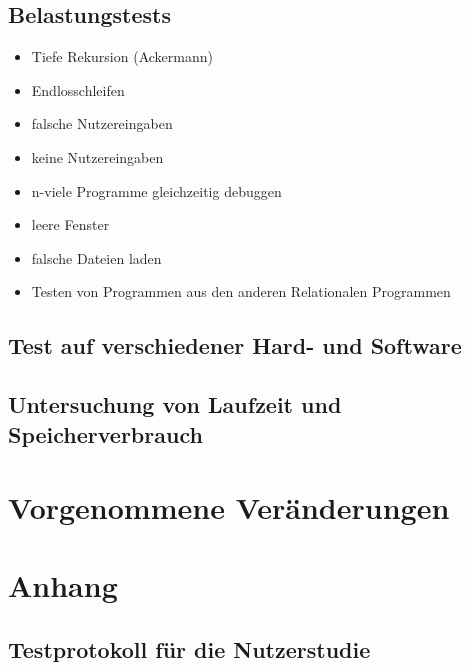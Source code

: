 \documentclass[parskip=full]{scrartcl}
\begin{document}
\subsection{Belastungstests}

\begin{itemize}
\item Tiefe Rekursion (Ackermann)
\item Endlosschleifen
\item falsche Nutzereingaben
\item keine Nutzereingaben
\item n-viele Programme gleichzeitig debuggen
\item leere Fenster
\item falsche Dateien laden
\item Testen von Programmen aus den anderen Relationalen Programmen

\end{itemize}

\subsection{Test auf verschiedener Hard- und Software}

\subsection{Untersuchung von Laufzeit und Speicherverbrauch}

\section{Vorgenommene Veränderungen}

\section{Anhang}
\subsection{Testprotokoll für die Nutzerstudie}
\end{document}
